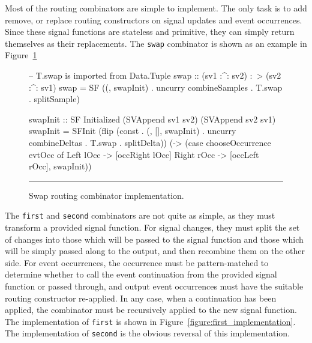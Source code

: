 Most of the routing combinators are simple to implement. The only task is to add
remove, or replace routing constructors on signal updates and event occurrences.
Since these signal functions are stateless and primitive, they can simply
return themselves as their replacements. The {\tt swap} combinator is shown as
an example in Figure~\ref{figure:swap_implementation}

\begin{figure}
\begin{code}
-- T.swap is imported from Data.Tuple
swap :: (sv1 :^: sv2) :~> (sv2 :^: sv1)
swap =
  SF ((, swapInit) . 
      uncurry combineSamples .
      T.swap . splitSample)

swapInit :: SF Initialized (SVAppend sv1 sv2) (SVAppend sv2 sv1)
swapInit =
  SFInit (flip (const .
                (, [], swapInit) .
                uncurry combineDeltas .
                T.swap . splitDelta))
          (\evtOcc ->
             (case chooseOccurrence evtOcc of
                Left lOcc  -> [occRight lOcc]
                Right rOcc -> [occLeft rOcc], swapInit))

\end{code}
\hrule
\caption{Swap routing combinator implementation.}
\label{figure:swap_implementation}
\end{figure}

The {\tt first} and {\tt second} combinators are not quite as simple, as they
must transform a provided signal function. For signal changes, they must split
the set of changes into those which will be passed to the signal function and
those which will be simply passed along to the output, and then recombine them
on the other side. For event occurrences, the occurrence must be pattern-matched
to determine whether to call the event continuation from the provided signal
function or passed through, and output event occurrences must have the suitable
routing constructor re-applied. In any case, when a continuation has been
applied, the combinator must be recursively applied to the new signal function.
The implementation of {\tt first} is shown in Figure~\ref{figure:first_implementation}.
The implementation of {\tt second} is the obvious reversal of this
implementation.

